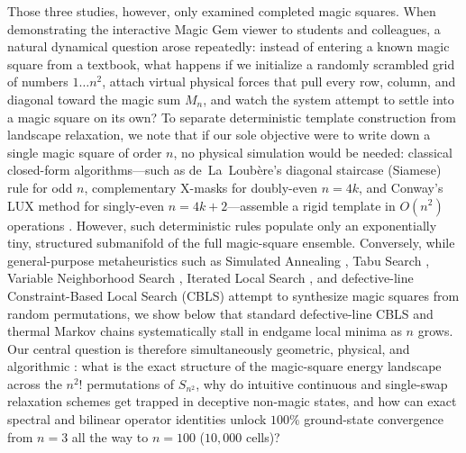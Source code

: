 Those three studies, however, only examined completed magic squares. When demonstrating the interactive Magic Gem viewer to students and colleagues, a natural dynamical question arose repeatedly: instead of entering a known magic square from a textbook, what happens if we initialize a randomly scrambled grid of numbers $1\dots n^2$, attach virtual physical forces that pull every row, column, and diagonal toward the magic sum $M_n$, and watch the system attempt to settle into a magic square on its own? To separate deterministic template construction from landscape relaxation, we note that if our sole objective were to write down a single magic square of order $n$, no physical simulation would be needed: classical closed-form algorithms---such as de~La~Loub\`ere's diagonal staircase (Siamese) rule for odd $n$, complementary X-masks for doubly-even $n=4k$, and Conway's LUX method for singly-even $n=4k+2$---assemble a rigid template in $O(n^2)$ operations \cite{loubere1693,andrews1960magic,berlekamp2004winning}. However, such deterministic rules populate only an exponentially tiny, structured submanifold of the full magic-square ensemble. Conversely, while general-purpose metaheuristics such as Simulated Annealing \cite{kirkpatrick1983optimization}, Tabu Search \cite{glover1989tabu}, Variable Neighborhood Search \cite{mladenovic1997variable}, Iterated Local Search \cite{lourenco2003iterated}, and defective-line Constraint-Based Local Search (CBLS) \cite{codognet2001yet,vanhentenryck2005constraint} attempt to synthesize magic squares from random permutations, we show below that standard defective-line CBLS and thermal Markov chains systematically stall in endgame local minima as $n$ grows. Our central question is therefore simultaneously geometric, physical, and algorithmic \cite{mezard1987spin,wales2003energy,diaconis1988group}: what is the exact structure of the magic-square energy landscape across the $n^2!$ permutations of $S_{n^2}$, why do intuitive continuous and single-swap relaxation schemes get trapped in deceptive non-magic states, and how can exact spectral and bilinear operator identities unlock $100\%$ ground-state convergence from $n = 3$ all the way to $n = 100$ ($10{,}000$ cells)?

